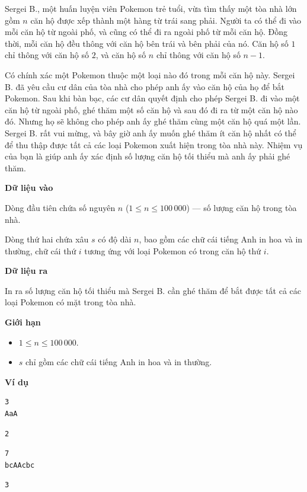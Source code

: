 \documentclass[12pt,a4paper]{article}
\newcommand{\inputformat}{%
  \vspace{6pt}\textbf{\textcolor{sectioncolor}{Dữ liệu vào}}\par\vspace{2pt}%
}
\newcommand{\outputformat}{%
  \vspace{6pt}\textbf{\textcolor{sectioncolor}{Dữ liệu ra}}\par\vspace{2pt}%
}
\newcommand{\constraints}{%
  \vspace{6pt}\textbf{\textcolor{sectioncolor}{Giới hạn}}\par\vspace{2pt}%
}
\newcommand{\example}{%
  \vspace{6pt}\textbf{\textcolor{sectioncolor}{Ví dụ}}\par\vspace{2pt}%
}
\begin{document}
Sergei B., một huấn luyện viên Pokemon trẻ tuổi, vừa tìm thấy một tòa nhà lớn gồm $n$ căn hộ được xếp thành một hàng từ trái sang phải. Người ta có thể đi vào mỗi căn hộ từ ngoài phố, và cũng có thể đi ra ngoài phố từ mỗi căn hộ. Đồng thời, mỗi căn hộ đều thông với căn hộ bên trái và bên phải của nó. Căn hộ số $1$ chỉ thông với căn hộ số $2$, và căn hộ số $n$ chỉ thông với căn hộ số $n - 1$.

Có chính xác một Pokemon thuộc một loại nào đó trong mỗi căn hộ này. Sergei B. đã yêu cầu cư dân của tòa nhà cho phép anh ấy vào căn hộ của họ để bắt Pokemon. Sau khi bàn bạc, các cư dân quyết định cho phép Sergei B. đi vào một căn hộ từ ngoài phố, ghé thăm một số căn hộ và sau đó đi ra từ một căn hộ nào đó. Nhưng họ sẽ không cho phép anh ấy ghé thăm cùng một căn hộ quá một lần. Sergei B. rất vui mừng, và bây giờ anh ấy muốn ghé thăm ít căn hộ nhất có thể để thu thập được tất cả các loại Pokemon xuất hiện trong tòa nhà này. Nhiệm vụ của bạn là giúp anh ấy xác định số lượng căn hộ tối thiểu mà anh ấy phải ghé thăm.

\inputformat
\begin{inputbox}
Dòng đầu tiên chứa số nguyên $n$ ($1 \le n \le 100\,000$) — số lượng căn hộ trong tòa nhà.

Dòng thứ hai chứa xâu $s$ có độ dài $n$, bao gồm các chữ cái tiếng Anh in hoa và in thường, chữ cái thứ $i$ tương ứng với loại Pokemon có trong căn hộ thứ $i$.
\end{inputbox}

\outputformat
\begin{outputbox}
In ra số lượng căn hộ tối thiểu mà Sergei B. cần ghé thăm để bắt được tất cả các loại Pokemon có mặt trong tòa nhà.
\end{outputbox}

\constraints
\begin{constraintbox}
\begin{itemize}
    \item $1 \le n \le 100\,000$.
    \item $s$ chỉ gồm các chữ cái tiếng Anh in hoa và in thường.
\end{itemize}
\end{constraintbox}

\example
\begin{lstlisting}
3
AaA
\end{lstlisting}
\begin{lstlisting}
2
\end{lstlisting}

\begin{lstlisting}
7
bcAAcbc
\end{lstlisting}
\begin{lstlisting}
3
\end{lstlisting}
\end{document}
